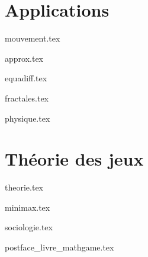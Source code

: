 \documentclass[11pt]{report}
\begin{document}
\part{Applications}

{mouvement.tex}

{approx.tex}

{equadiff.tex}

{fractales.tex}

{physique.tex}



\part{Théorie des jeux}

{theorie.tex}

{minimax.tex}

{sociologie.tex}



\clearemptydoublepage


{postface_livre_mathgame.tex}

\vfill


\bigskip
\bigskip
\end{document}
